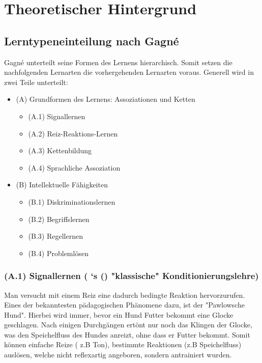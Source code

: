 \chapter{Theoretischer Hintergrund}

\section{Lerntypeneinteilung nach Gagné}

Gagné unterteilt seine Formen des Lernens hierarchisch. Somit setzen die nachfolgenden Lernarten die vorhergehenden Lernarten voraus. Generell wird in zwei Teile unterteilt: 


\begin{itemize}
\item (A) Grundformen des Lernens: Assoziationen und Ketten 
    \begin{itemize}
        \item (A.1) Signallernen
        \item (A.2) Reiz-Reaktions-Lernen
        \item (A.3) Kettenbildung
        \item (A.4) Sprachliche Assoziation
    \end{itemize}
\item (B) Intellektuelle Fähigkeiten
    \begin{itemize}
        \item (B.1) Diskriminationslernen
        \item (B.2) Begriffslernen
        \item (B.3) Regellernen 
        \item (B.4) Problemlösen
    \end{itemize}
\end{itemize}

\subsection[]{(A.1) Signallernen (\citeauthor{pawlow1977klassische} `s () "klassische" Konditionierungslehre)}

Man versucht mit einem Reiz eine dadurch bedingte Reaktion hervorzurufen. Eines der bekanntesten pädagogischen Phänomene dazu, ist der "Pawlowsche Hund". Hierbei wird immer, bevor ein Hund Futter bekommt eine Glocke geschlagen. Nach einigen Durchgängen ertönt nur noch das Klingen der Glocke, was den Speichelfluss des Hundes anreizt, ohne dass er Futter bekommt. Somit können einfache Reize ( z.B Ton), bestimmte Reaktionen (z.B Speichelfluss) auslösen, welche nicht reflexartig angeboren, sondern antrainiert wurden.

